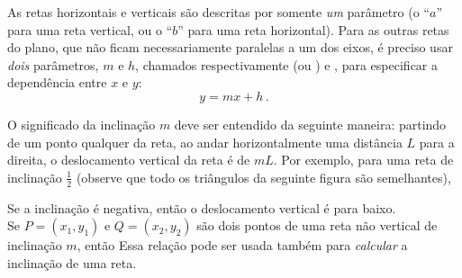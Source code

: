  As retas horizontais e verticais são descritas por somente \emph{um} parâmetro (o ``$a$''
para uma reta vertical, ou o ``$b$'' para uma reta horizontal). Para as outras retas do
plano, que não ficam necessariamente paralelas a um dos eixos, é preciso usar 
\emph{dois} parâmetros, $m$ e $h$, chamados respectivamente
 (ou ) e , para
especificar a dependência entre $x$ e $y$:
$$y=mx+h\,.$$
\begin{center}
\begin{bmlimage}\end{bmlimage}
\end{center}
 O significado da inclinação $m$ deve ser entendido da seguinte maneira: partindo de um
ponto qualquer da reta, ao andar horizontalmente uma distância $L$ para a direita, o
deslocamento vertical da reta é de $mL$. Por exemplo, para uma reta de inclinação
$\frac12$ (observe que todo os triângulos da seguinte figura são semelhantes),
\begin{center}
\begin{bmlimage}\end{bmlimage}
\end{center}
Se a inclinação é negativa, então o deslocamento vertical é para baixo.\\

 Se $P=(x_1,y_1)$ e $Q=(x_2,y_2)$ 
 são dois pontos de uma reta não vertical de inclinação $m$, então
Essa relação pode ser usada também para \emph{calcular} a inclinação de uma reta. 

